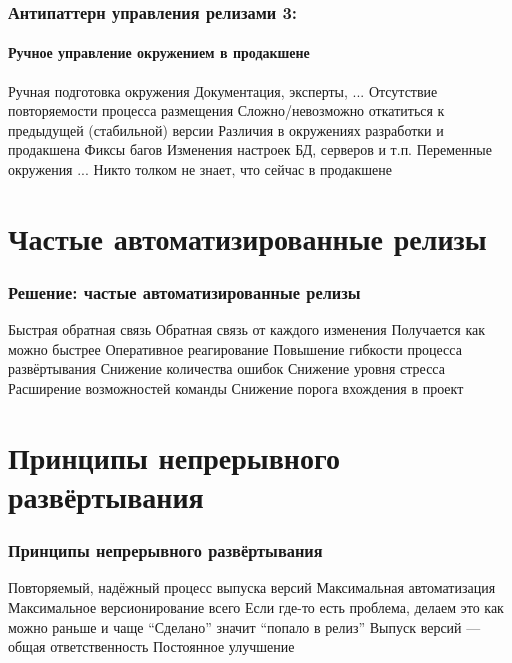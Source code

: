 \documentclass{../../slides-style}
\begin{document}
    \begin{frame}
        \frametitle{Антипаттерн управления релизами 3:}
        \framesubtitle{Ручное управление окружением в продакшене}
        \begin{outline}
            \1 Ручная подготовка окружения
                \2 Документация, эксперты, ...
            \1 Отсутствие повторяемости процесса размещения
                \2 Сложно/невозможно откатиться к предыдущей (стабильной) версии
            \1 Различия в окружениях разработки и продакшена
                \2 Фиксы багов
                \2 Изменения настроек БД, серверов и т.п.
                \2 Переменные окружения
                \2 ...
            \1 Никто толком не знает, что сейчас в продакшене
        \end{outline}
    \end{frame}

    \section{Частые автоматизированные релизы}

    \begin{frame}
        \frametitle{Решение: частые автоматизированные релизы}
        \begin{outline}
            \1 Быстрая обратная связь
                \2 Обратная связь от каждого изменения
                \2 Получается как можно быстрее
                \2 Оперативное реагирование
            \1 Повышение гибкости процесса развёртывания
            \1 Снижение количества ошибок
            \1 Снижение уровня стресса
            \1 Расширение возможностей команды
            \1 Снижение порога вхождения в проект
        \end{outline}
    \end{frame}

    \section{Принципы непрерывного развёртывания}

    \begin{frame}
        \frametitle{Принципы непрерывного развёртывания}
        \begin{outline}
            \1 Повторяемый, надёжный процесс выпуска версий
            \1 Максимальная автоматизация
            \1 Максимальное версионирование всего
            \1 Если где-то есть проблема, делаем это как можно раньше и чаще
            \1 ``Сделано'' значит ``попало в релиз''
            \1 Выпуск версий --- общая ответственность
            \1 Постоянное улучшение
        \end{outline}
    \end{frame}
\end{document}
